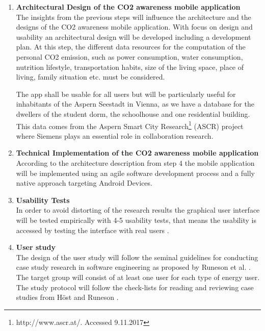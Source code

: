 \begin{enumerate}
	\item \textbf{Architectural Design of the CO2 awareness mobile application} \\
	The insights from the previous steps will influence the architecture and the designs of the CO2 awareness mobile application. With focus on design and usability an architectural design will be developed including a development plan. At this step, the different data resources for the computation of the personal CO2 emission, such as power consumption, water consumption, nutrition lifestyle, transportation habits, size of the living space, place of living, family situation etc. must be considered.
	
	The app shall be usable for all users but will be particularly useful for inhabitants of the Aspern Seestadt in Vienna, as we have a database for the dwellers of the student dorm, the schoolhouse and one residential building. This data comes from the Aspern Smart City Research\footnote{http://www.ascr.at/. Accessed 9.11.2017} (ASCR) project where Siemens plays an essential role in collaboration research. 
	
	\item \textbf{Technical Implementation of the CO2 awareness mobile application} \\
	According to the architecture description from step 4 the mobile application will be implemented using an agile software development process and a fully native approach targeting Android Devices.
	
	\item \textbf{Usability Tests} \\
	In order to avoid distorting of the research results the graphical user interface will be tested empirically with 4-5 usability tests, that means the usability is accessed by testing the interface with real users \cite{nielsen1994usability}.
	
	\item \textbf{User study} \\
	The design of the user study will follow the seminal guidelines for conducting case study research in software engineering as proposed by Runeson et al. \cite{runeson2012case}. The target group will consist of at least one user for each type of energy user. The study protocol will follow the check-lists for reading and reviewing case studies from H\"ost and Runeson \cite{host2007checklists}.
	

\end{enumerate}
